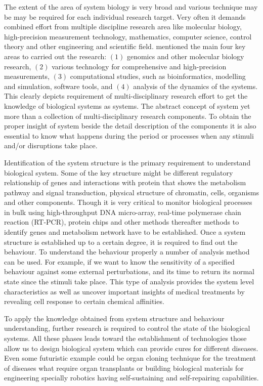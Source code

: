 The extent of the area of system biology is very broad and various technique may be may be required for each individual 
research target. Very often it demands combined effort from multiple discipline research area like molecular biology, 
high-precision measurement technology, mathematics, computer science, control theory and other engineering and 
scientific field. \cite{Kitano:2002} mentioned the main four key areas to carried out the research: $(1)$ genomics
and other molecular biology research, $(2)$ various technology for comprehensive and high-precision measurements,
$(3)$ computational studies, such as bioinformatics, modelling and simulation, software tools, and 
$(4)$ analysis of the dynamics of the systems. This clearly depicts requirement of multi-disciplinary research effort
to get the knowledge of biological systems as systems. The abstract concept of system yet more than a collection 
of multi-disciplinary research components. To obtain the proper insight of system beside the detail description of
the components it is also essential to know what happens during the period or processes when any stimuli and/or 
disruptions take place.

Identification of the system structure is the primary requirement to understand biological system. Some of the key 
structure might be different regulatory relationship of genes and interactions with protein that shows the metabolism
pathway and signal transduction, physical structure of chromatin, cells, organisms and other components. Though it is 
very critical to monitor biological processes in bulk using high-throughput DNA micro-array, real-time polymerase 
chain reaction (RT-PCR), protein chips and other methods thereafter methods to identify genes and metabolism network
have to be established. Once a system structure is established up to a certain degree, it is required to find out
the behaviour. To understand the behaviour properly a number of analysis method can be used. For example, if we want
to know the sensitivity of a specified behaviour against some external perturbations, and its time to return its
normal state since the stimuli take place. This type of analysis provides the system level characteristics as well as
uncover important insights of medical treatments by revealing cell response to certain chemical affinities. 

To apply the knowledge obtained from system structure and behaviour understanding, further research is required to 
control the state of the biological systems. All these phases leads toward the establishment of technologies those
allow us to design biological system which can provide cures for different diseases. Even some futuristic example
could be organ cloning technique for the treatment of diseases what require organ transplants or building 
biological materials for engineering specially robotics having self-sustaining and self-repairing capabilities.

